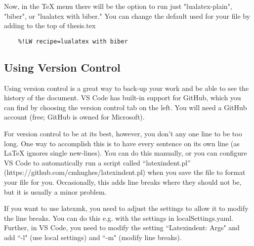 \documentclass{article}
\begin{document}
Now, in the TeX menu there will be the option to run just "lualatex-plain", "biber", or "lualatex with biber."
You can change the default used for your file by adding to the top of thesis.tex
\begin{verbatim}
    %!LW recipe=lualatex with biber
\end{verbatim}

\subsection{Using Version Control}
Using version control is a great way to back-up your work and be able to see the history of the document.
VS Code has built-in support for GitHub, which you can find by choosing the version control tab on the left.
You will need a GitHub account (free; GitHub is owned for Microsoft).

For version control to be at its best, however, you don't any one line to be too long.
One way to accomplish this is to have every sentence on its own line (as LaTeX ignores single new-lines).
You can do this manually, or you can configure VS Code to automatically run a script called ``latexindent.pl'' (https://github.com/cmhughes/latexindent.pl) when you save the file to format your file for you. Occasionally, this adds line breaks where they should not be, but it is usually a minor problem.

If you want to use latexmk, you need to adjust the settings to allow it to modify the line breaks. You can do this e.g. with the settings in localSettings.yaml. Further, in VS Code, you need to modify the setting ``Latexindent: Args" and add ``-l" (use local settings) and ``-m" (modify line breaks).
\end{document}
